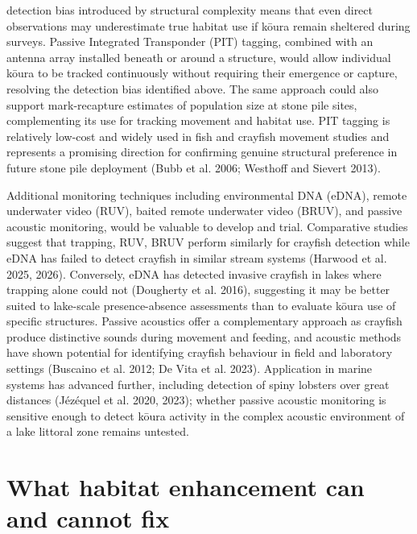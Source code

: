 \documentclass[
  12pt,
  a4paper,
  oneside]{scrbook}
\begin{document}
detection bias introduced by structural complexity means that even
direct observations may underestimate true habitat use if kōura remain
sheltered during surveys. Passive Integrated Transponder (PIT) tagging,
combined with an antenna array installed beneath or around a structure,
would allow individual kōura to be tracked continuously without
requiring their emergence or capture, resolving the detection bias
identified above. The same approach could also support mark-recapture
estimates of population size at stone pile sites, complementing its use
for tracking movement and habitat use. PIT tagging is relatively
low-cost and widely used in fish and crayfish movement studies and
represents a promising direction for confirming genuine structural
preference in future stone pile deployment (Bubb et al. 2006; Westhoff
and Sievert 2013).

Additional monitoring techniques including environmental DNA (eDNA),
remote underwater video (RUV), baited remote underwater video (BRUV),
and passive acoustic monitoring, would be valuable to develop and trial.
Comparative studies suggest that trapping, RUV, BRUV perform similarly
for crayfish detection while eDNA has failed to detect crayfish in
similar stream systems (Harwood et al. 2025, 2026). Conversely, eDNA has
detected invasive crayfish in lakes where trapping alone could not
(Dougherty et al. 2016), suggesting it may be better suited to
lake-scale presence-absence assessments than to evaluate kōura use of
specific structures. Passive acoustics offer a complementary approach as
crayfish produce distinctive sounds during movement and feeding, and
acoustic methods have shown potential for identifying crayfish behaviour
in field and laboratory settings (Buscaino et al. 2012; De Vita et al.
2023). Application in marine systems has advanced further, including
detection of spiny lobsters over great distances (Jézéquel et al. 2020,
2023); whether passive acoustic monitoring is sensitive enough to detect
kōura activity in the complex acoustic environment of a lake littoral
zone remains untested.

\section{What habitat enhancement can and cannot
fix}\label{what-habitat-enhancement-can-and-cannot-fix}
\end{document}

